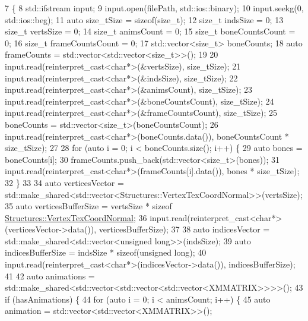 \begin{DoxyCode}
7 \{
8     std::ifstream input;
9     input.open(filePath, std::ios::binary);
10     input.seekg(0, std::ios::beg);
11     \textcolor{keyword}{auto} size\_tSize = \textcolor{keyword}{sizeof}(size\_t);
12     \textcolor{keywordtype}{size\_t} indsSize = 0;
13     \textcolor{keywordtype}{size\_t} vertsSize = 0;
14     \textcolor{keywordtype}{size\_t} animsCount = 0;
15     \textcolor{keywordtype}{size\_t} boneCountsCount = 0;
16     \textcolor{keywordtype}{size\_t} frameCountsCount = 0;
17     std::vector<size\_t> boneCounts;
18     \textcolor{keyword}{auto} frameCounts = std::vector<std::vector<size\_t>>();
19 
20     input.read(reinterpret\_cast<char*>(&vertsSize), size\_tSize);
21     input.read(reinterpret\_cast<char*>(&indsSize), size\_tSize);
22     input.read(reinterpret\_cast<char*>(&animsCount), size\_tSize);
23     input.read(reinterpret\_cast<char*>(&boneCountsCount), size\_tSize);
24     input.read(reinterpret\_cast<char*>(&frameCountsCount), size\_tSize);
25     boneCounts = std::vector<size\_t>(boneCountsCount);
26     input.read(reinterpret\_cast<char*>(boneCounts.data()), boneCountsCount * size\_tSize);
27 
28     \textcolor{keywordflow}{for} (\textcolor{keyword}{auto} i = 0; i < boneCounts.size(); i++) \{
29         \textcolor{keyword}{auto} bones = boneCounts[i];
30         frameCounts.push\_back(std::vector<size\_t>(bones));
31         input.read(reinterpret\_cast<char*>(frameCounts[i].data()), bones * size\_tSize);
32     \}
33 
34     \textcolor{keyword}{auto} verticesVector = std::make\_shared<std::vector<Structures::VertexTexCoordNormal>>(vertsSize);
35     \textcolor{keyword}{auto} verticesBufferSize = vertsSize * \textcolor{keyword}{sizeof} 
      \mbox{\hyperlink{struct_structures_1_1_vertex_tex_coord_normal}{Structures::VertexTexCoordNormal}};
36     input.read(reinterpret\_cast<char*>(verticesVector->data()), verticesBufferSize);
37 
38     \textcolor{keyword}{auto} indicesVector = std::make\_shared<std::vector<unsigned long>>(indsSize);
39     \textcolor{keyword}{auto} indicesBufferSize = indsSize * \textcolor{keyword}{sizeof}(\textcolor{keywordtype}{unsigned} long);
40     input.read(reinterpret\_cast<char*>(indicesVector->data()), indicesBufferSize);
41 
42     \textcolor{keyword}{auto} animations = std::make\_shared<std::vector<std::vector<std::vector<XMMATRIX>>>>();
43     \textcolor{keywordflow}{if} (hasAnimations) \{
44         \textcolor{keywordflow}{for} (\textcolor{keyword}{auto} i = 0; i < animsCount; i++) \{
45             \textcolor{keyword}{auto} animation = std::vector<std::vector<XMMATRIX>>();

\end{DoxyCode}
